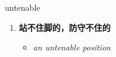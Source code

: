 
\begin{frame}
{\huge untenable}
\begin{center}
\begin{enumerate}\Large
  \item \textbf{站不住脚的，防守不住的}
  \begin{itemize}
    \item \em{\Large{an untenable position}}
  \end{itemize}
\end{enumerate}
\end{center}
\end{frame}
